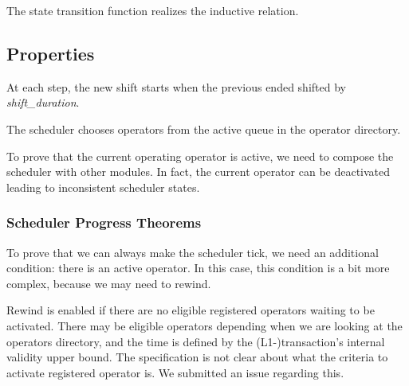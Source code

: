 \begin{theorem}
  \leanok
  \label{thm:Scheduler.Computational.computational}
  The state transition function realizes the inductive relation.
  \end{theorem}

\subsection{Properties}

\begin{theorem}
  \leanok
  \label{thm:Scheduler.Properties.ShiftStepShiftInterval}
  At each step, the new shift starts when the previous ended shifted by
\emph{shift\_duration}.
  \end{theorem}

\begin{lemma}
  \leanok
  \label{lmm:Scheduler.Properties.CurrentOperatorIsChoosenFromActive}
  The scheduler chooses operators from the active queue in the operator directory.
  \end{lemma}

To prove that the current operating operator is active, we need to compose the
scheduler with other modules.
%
In fact, the current operator can be deactivated leading to inconsistent scheduler states.

\subsubsection{Scheduler Progress Theorems}

To prove that we can always make the scheduler tick, we need an additional
condition: there is an active operator.
%
In this case, this condition is a bit more complex, because we may need to rewind.

Rewind is enabled if there are no eligible registered operators waiting to be
activated.
%
There may be eligible operators depending when we are looking at the operators
directory, and the time is defined by the (L1-)transaction's internal validity
upper bound.
%
The specification is not clear about what the criteria to activate registered
operator is.
%
We submitted an issue regarding this.

